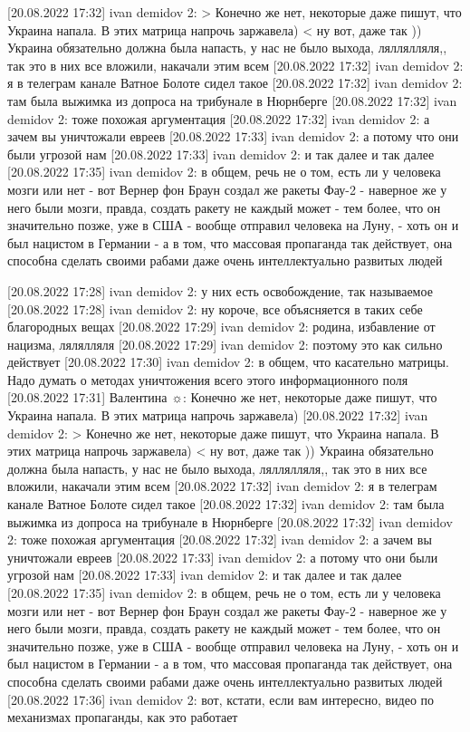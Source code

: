 [20.08.2022 17:32] ivan demidov 2: 
> Конечно же нет, некоторые даже пишут, что Украина напала. В этих матрица напрочь заржавела) <
ну вот, даже так )) Украина обязательно должна была напасть, у нас не было выхода, ляллялляля,, так это в них все вложили, накачали этим всем
[20.08.2022 17:32] ivan demidov 2: я в телеграм канале Ватное Болоте сидел такое
[20.08.2022 17:32] ivan demidov 2: там была выжимка из допроса на трибунале в Нюрнберге
[20.08.2022 17:32] ivan demidov 2: тоже похожая аргументация
[20.08.2022 17:32] ivan demidov 2: а зачем вы уничтожали евреев
[20.08.2022 17:33] ivan demidov 2: а потому что они были угрозой нам
[20.08.2022 17:33] ivan demidov 2: и так далее и так далее
[20.08.2022 17:35] ivan demidov 2: в общем, речь не о том, есть ли у человека мозги или нет - вот Вернер фон Браун создал же ракеты Фау-2 - наверное же у него были мозги, правда, создать ракету не каждый может - тем более, что он значительно позже, уже в США - вообще отправил человека на Луну, - хоть он и был нацистом в Германии - а в том, что массовая пропаганда так действует, она способна сделать своими рабами даже очень интеллектуально развитых людей

[20.08.2022 17:28] ivan demidov 2: у них есть освобождение, так называемое
[20.08.2022 17:28] ivan demidov 2: ну короче, все объясняется в таких себе благородных вещах
[20.08.2022 17:29] ivan demidov 2: родина, избавление от нацизма, лялялляля
[20.08.2022 17:29] ivan demidov 2: поэтому это как сильно действует
[20.08.2022 17:30] ivan demidov 2: в общем, что касательно матрицы. Надо думать о методах уничтожения всего этого информационного поля
[20.08.2022 17:31] Валентина ☼: Конечно же нет, некоторые даже пишут, что Украина напала. В этих матрица напрочь заржавела)
[20.08.2022 17:32] ivan demidov 2: 
> Конечно же нет, некоторые даже пишут, что Украина напала. В этих матрица напрочь заржавела) <
ну вот, даже так )) Украина обязательно должна была напасть, у нас не было выхода, ляллялляля,, так это в них все вложили, накачали этим всем
[20.08.2022 17:32] ivan demidov 2: я в телеграм канале Ватное Болоте сидел такое
[20.08.2022 17:32] ivan demidov 2: там была выжимка из допроса на трибунале в Нюрнберге
[20.08.2022 17:32] ivan demidov 2: тоже похожая аргументация
[20.08.2022 17:32] ivan demidov 2: а зачем вы уничтожали евреев
[20.08.2022 17:33] ivan demidov 2: а потому что они были угрозой нам
[20.08.2022 17:33] ivan demidov 2: и так далее и так далее
[20.08.2022 17:35] ivan demidov 2: в общем, речь не о том, есть ли у человека мозги или нет - вот Вернер фон Браун создал же ракеты Фау-2 - наверное же у него были мозги, правда, создать ракету не каждый может - тем более, что он значительно позже, уже в США - вообще отправил человека на Луну, - хоть он и был нацистом в Германии - а в том, что массовая пропаганда так действует, она способна сделать своими рабами даже очень интеллектуально развитых людей
[20.08.2022 17:36] ivan demidov 2: вот, кстати, если вам интересно, видео по механизмах пропаганды, как это работает

